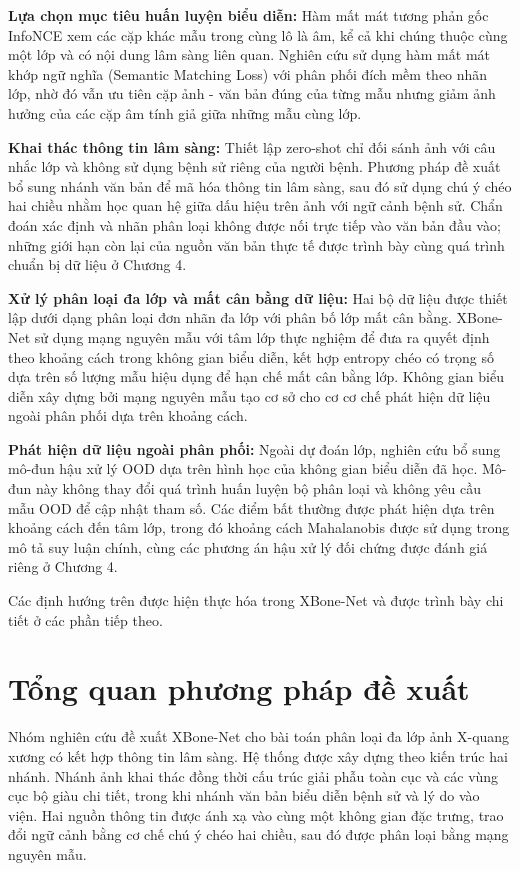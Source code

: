 \textbf{Lựa chọn mục tiêu huấn luyện biểu diễn:} Hàm mất mát tương phản gốc InfoNCE xem các cặp khác mẫu trong cùng lô là âm, kể cả khi chúng thuộc cùng một lớp và có nội dung lâm sàng liên quan. Nghiên cứu sử dụng hàm mất mát khớp ngữ nghĩa (Semantic Matching Loss) với phân phối đích mềm theo nhãn lớp, nhờ đó vẫn ưu tiên cặp ảnh - văn bản đúng của từng mẫu nhưng giảm ảnh hưởng của các cặp âm tính giả giữa những mẫu cùng lớp.

\textbf{Khai thác thông tin lâm sàng:} Thiết lập zero-shot chỉ đối sánh ảnh với câu nhắc lớp và không sử dụng bệnh sử riêng của người bệnh. Phương pháp đề xuất bổ sung nhánh văn bản để mã hóa thông tin lâm sàng, sau đó sử dụng chú ý chéo hai chiều nhằm học quan hệ giữa dấu hiệu trên ảnh với ngữ cảnh bệnh sử. Chẩn đoán xác định và nhãn phân loại không được nối trực tiếp vào văn bản đầu vào; những giới hạn còn lại của nguồn văn bản thực tế được trình bày cùng quá trình chuẩn bị dữ liệu ở Chương 4.

\textbf{Xử lý phân loại đa lớp và mất cân bằng dữ liệu:} Hai bộ dữ liệu được thiết lập dưới dạng phân loại đơn nhãn đa lớp với phân bố lớp mất cân bằng. XBone-Net sử dụng mạng nguyên mẫu với tâm lớp thực nghiệm để đưa ra quyết định theo khoảng cách trong không gian biểu diễn, kết hợp entropy chéo có trọng số dựa trên số lượng mẫu hiệu dụng để hạn chế mất cân bằng lớp. Không gian biểu diễn xây dựng bởi mạng nguyên mẫu tạo cơ sở cho cơ cơ chế phát hiện dữ liệu ngoài phân phối dựa trên khoảng cách.

\textbf{Phát hiện dữ liệu ngoài phân phối:} Ngoài dự đoán lớp, nghiên cứu bổ sung mô-đun hậu xử lý OOD dựa trên hình học của không gian biểu diễn đã học. Mô-đun này không thay đổi quá trình huấn luyện bộ phân loại và không yêu cầu mẫu OOD để cập nhật tham số. Các điểm bất thường được phát hiện dựa trên khoảng cách đến tâm lớp, trong đó khoảng cách Mahalanobis được sử dụng trong mô tả suy luận chính, cùng các phương án hậu xử lý đối chứng được đánh giá riêng ở Chương 4.

Các định hướng trên được hiện thực hóa trong XBone-Net và được trình bày chi tiết ở các phần tiếp theo.

\section{Tổng quan phương pháp đề xuất}
\label{sec:final-pipeline}

Nhóm nghiên cứu đề xuất XBone-Net cho bài toán phân loại đa lớp ảnh X-quang xương có kết hợp thông tin lâm sàng. Hệ thống được xây dựng theo kiến trúc hai nhánh. Nhánh ảnh khai thác đồng thời cấu trúc giải phẫu toàn cục và các vùng cục bộ giàu chi tiết, trong khi nhánh văn bản biểu diễn bệnh sử và lý do vào viện. Hai nguồn thông tin được ánh xạ vào cùng một không gian đặc trưng, trao đổi ngữ cảnh bằng cơ chế chú ý chéo hai chiều, sau đó được phân loại bằng mạng nguyên mẫu.

